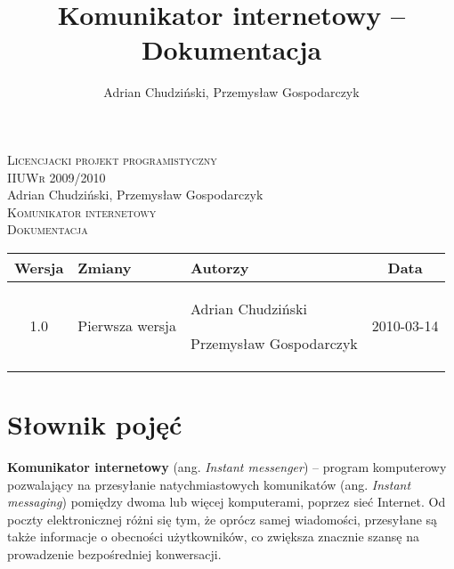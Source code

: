 \documentclass[a4paper,12pt]{article}
\author{Adrian Chudziński, Przemysław Gospodarczyk}
\title{Komunikator internetowy -- Dokumentacja}
\begin{document}
\makeatletter
    \renewcommand\@seccntformat[1]{\csname the#1\endcsname.\quad}
    \renewcommand\numberline[1]{#1.\hskip0.7em}
\makeatother

\begin{titlepage}
\begin{center}

    \textsc{Licencjacki projekt programistyczny}\\[0.1cm]
    \textsc{IIUWr 2009/2010}\\[6cm]
    Adrian Chudziński, Przemysław Gospodarczyk\\[1cm]
    \textsc{\Large Komunikator internetowy}\\[0.25cm]
    \textsc{\large Dokumentacja}\\[8.675cm]

    {\footnotesize
    \begin{tabular}{| c | p{4cm} | p{4.25cm} | c | }
        \hline
        Wersja  &
        Zmiany  &
        Autorzy &
        Data    \\
        \hline
        1.0                                                                   &
        Pierwsza wersja                                                       &
        \par Adrian Chudziński \par Przemysław Gospodarczyk                                                  &
        2010-03-14                                                            \\
        \hline
    \end{tabular}
    }

\end{center}
\end{titlepage}

\break

\setcounter{page}{2}

\tableofcontents

\break
\section[Słownik pojęć]{Słownik pojęć}
\textbf{Komunikator internetowy} (ang. \textit{Instant messenger}) -- program komputerowy pozwalający na przesyłanie natychmiastowych komunikatów (ang. \textit{Instant messaging}) pomiędzy dwoma lub więcej komputerami, poprzez sieć Internet. Od poczty elektronicznej różni się tym, że oprócz samej wiadomości, przesyłane są także informacje o obecności użytkowników, co zwiększa znacznie szansę na prowadzenie bezpośredniej konwersacji.\\
\end{document}
